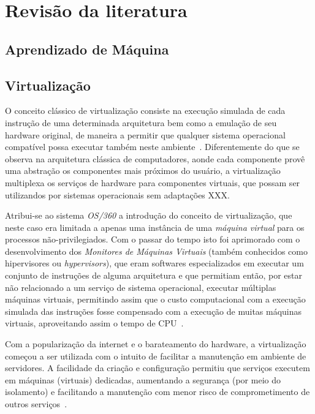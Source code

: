 %
%

\chapter{Revisão da literatura}

\section{Aprendizado de Máquina}\label{sec:aprendizado}



\section{Virtualização}\label{sec:virt}

O conceito clássico de virtualização consiste na execução simulada de cada
instrução de uma determinada arquitetura bem como a emulação de seu
hardware original, de maneira a permitir que qualquer sistema operacional
compatível possa executar também neste ambiente~\cite{goldberg1974survey}.
Diferentemente do que se observa na arquitetura clássica de computadores,
aonde cada componente provê uma abstração os componentes mais próximos do
usuário, a virtualização multiplexa os serviços de hardware para
componentes virtuais, que possam ser utilizandos por sistemas operacionais
sem adaptações XXX. %


Atribui-se ao sistema \emph{OS/360} a introdução do conceito de
virtualização, que neste caso era limitada a apenas uma instância de uma
\emph{máquina virtual} para os processos não-privilegiados. Com o passar do
tempo isto foi aprimorado com o desenvolvimento dos \emph{Monitores de
Máquinas Virtuais} (também conhecidos como hipervisores ou
\emph{hypervisors}), que eram softwares especializados em executar um
conjunto de instruções de alguma arquitetura e que permitiam então, por
estar não relacionado a um serviço de sistema operacional, executar
múltiplas máquinas virtuais, permitindo assim que o custo computacional com
a execução simulada das instruções fosse compensado com a execução de
muitas máquinas virtuais, aproveitando assim o tempo de
CPU~\cite{goldberg1974survey}.

Com a popularização da internet e o barateamento do hardware, a
virtualização começou a ser utilizada com o intuito de facilitar a
manutenção em ambiente de servidores. A facilidade da criação e
configuração permitiu que serviços executem em máquinas (virtuais)
dedicadas, aumentando a segurança (por meio do isolamento) e facilitando a
manutenção com menor risco de comprometimento de outros
serviços~\cite{smith2005architecture}.

